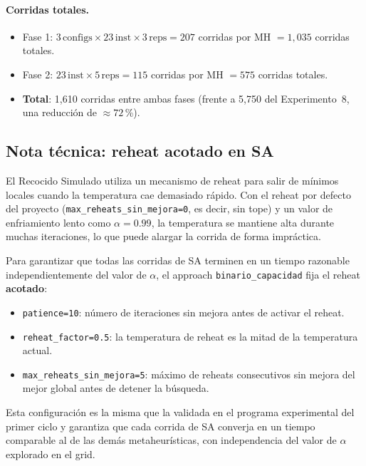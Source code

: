 \paragraph{Corridas totales.}
\begin{itemize}
\item Fase 1: $3\,\text{configs} \times 23\,\text{inst} \times
  3\,\text{reps} = 207$ corridas por MH
  $= 1{,}035$ corridas totales.
\item Fase 2: $23\,\text{inst} \times 5\,\text{reps} = 115$ corridas
  por MH $= 575$ corridas totales.
\item \textbf{Total}: 1{,}610 corridas entre ambas fases
  (frente a 5{,}750 del Experimento~8, una reducción de $\approx 72$\,\%).
\end{itemize}

\subsection{Nota técnica: reheat acotado en SA}
\label{nota:reheat-acotado-binario-capacidad}

El Recocido Simulado utiliza un mecanismo de reheat para salir de
mínimos locales cuando la temperatura cae demasiado rápido. Con el
reheat por defecto del proyecto (\texttt{max\_reheats\_sin\_mejora=0},
es decir, sin tope) y un valor de enfriamiento lento como
$\alpha = 0.99$, la temperatura se mantiene alta durante muchas
iteraciones, lo que puede alargar la corrida de forma impráctica.

Para garantizar que todas las corridas de SA terminen en un tiempo
razonable independientemente del valor de $\alpha$, el approach
\texttt{binario\_capacidad} fija el reheat \textbf{acotado}:

\begin{itemize}
\item \texttt{patience=10}: número de iteraciones sin mejora antes de
  activar el reheat.
\item \texttt{reheat\_factor=0.5}: la temperatura de reheat es la mitad
  de la temperatura actual.
\item \texttt{max\_reheats\_sin\_mejora=5}: máximo de reheats
  consecutivos sin mejora del mejor global antes de detener la búsqueda.
\end{itemize}

Esta configuración es la misma que la validada en el programa
experimental del primer ciclo y garantiza que cada corrida de SA
converja en un tiempo comparable al de las demás metaheurísticas,
con independencia del valor de $\alpha$ explorado en el grid.

